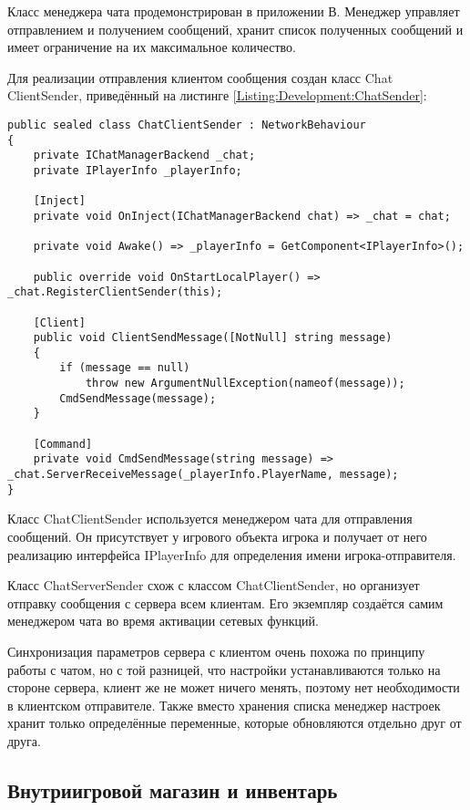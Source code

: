 Класс менеджера чата продемонстрирован в приложении В. Менеджер управляет отправлением и получением сообщений, хранит список полученных сообщений и имеет ограничение на их максимальное количество.

Для реализации отправления клиентом сообщения создан класс Chat \linebreak ClientSender, приведённый на листинге \ref{Listing:Development:ChatSender}:

\begin{lstlisting}[caption={Класс отправителя сообщений}, label=Listing:Development:ChatSender]
public sealed class ChatClientSender : NetworkBehaviour
{
    private IChatManagerBackend _chat;
    private IPlayerInfo _playerInfo;

    [Inject]
    private void OnInject(IChatManagerBackend chat) => _chat = chat;

    private void Awake() => _playerInfo = GetComponent<IPlayerInfo>();

    public override void OnStartLocalPlayer() => _chat.RegisterClientSender(this);

    [Client]
    public void ClientSendMessage([NotNull] string message)
    {
        if (message == null)
            throw new ArgumentNullException(nameof(message));
        CmdSendMessage(message);
    }

    [Command]
    private void CmdSendMessage(string message) => _chat.ServerReceiveMessage(_playerInfo.PlayerName, message);
}
\end{lstlisting}

Класс ChatClientSender используется менеджером чата для отправления сообщений. Он присутствует у игрового объекта игрока и получает от него реализацию интерфейса IPlayerInfo для определения имени игрока-отправителя.

Класс ChatServerSender схож с классом ChatClientSender, но организует отправку сообщения с сервера всем клиентам. Его экземпляр создаётся самим менеджером чата во время активации сетевых функций.

Синхронизация параметров сервера с клиентом очень похожа по принципу работы с чатом, но с той разницей, что настройки устанавливаются только на стороне сервера, клиент же не может ничего менять, поэтому нет необходимости в клиентском отправителе. Также вместо хранения списка менеджер настроек хранит только определённые переменные, которые обновляются отдельно друг от друга.


\subsection{Внутриигровой магазин и инвентарь}

